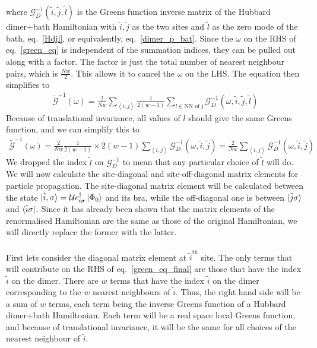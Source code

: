 \documentclass{report}
\numberwithin{equation}{section}
\begin{document}
where $\mathcal{G}_D^{-1}(\tilde i,\tilde j, \tilde l)$ is the Greens function inverse matrix of the Hubbard dimer+bath Hamiltonian with $\tilde i, \tilde j$ as the two sites and \(\tilde l\) as the zero mode of the bath, eq.~\ref{Hdjl}, or equivalently, eq.~\ref{dimer_p_bat}. Since the $\omega$ on the RHS of eq.~\ref{green_eq} is independent of the summation indices, they can be pulled out along with a factor. The factor is just the total number of nearest neighbour pairs, which is $\frac{Nw}{2}$. This allows it to cancel the $\omega$ on the LHS. The equation then simplifies to
\begin{equation}\begin{aligned}
	\mathcal{\tilde G}^{-1}(\omega) = \frac{2}{Nw}\sum_{\left<i,j\right>}\frac{1}{2(w-1)}\sum_{l \in \text{NN of j}}\mathcal{G}_D^{-1}\left(\omega, \tilde i, \tilde j, \tilde l\right)
\end{aligned}\end{equation}
Because of translational invariance, all values of \(l\) should give the same Greens function, and we can simplify this to
\begin{equation}\begin{aligned}
	\label{green_eq_final}
	\mathcal{\tilde G}^{-1}(\omega) = \frac{2}{Nw}\frac{1}{2(w-1)}\times 2(w-1)\sum_{\left<i,j\right>}\mathcal{G}_D^{-1}\left(\omega, \tilde i, \tilde j\right) = \frac{2}{Nw}\sum_{\left<i,j\right>}\mathcal{G}_D^{-1}\left(\omega, \tilde i, \tilde j\right)
\end{aligned}\end{equation}
We dropped the index \(\tilde l\) on \(\mathcal{G}_D^{-1}\) to mean that any particular choice of \(\tilde l\) will do. We will now calculate the site-diagonal and site-off-diagonal matrix elements for particle propagation. The site-diagonal matrix element will be calculated between the state $\ket{\tilde i, \sigma} = \mathcal{U}c^\dagger_{i\sigma}\ket{\Phi_0}$ and its bra, while the off-diagonal one is between $\ket{\tilde j\sigma}$ and $\bra{\tilde i\sigma}$. Since it has already been shown that the matrix elements of the renormalised Hamiltonian are the same as those of the original Hamiltonian, we will directly replace the former with the latter. \\\\
First lets consider the diagonal matrix element at $\tilde i^\text{th}$ site. The only terms that will contribute on the RHS of eq.~\ref{green_eq_final} are those that have the index $\tilde i$ on the dimer. There are $w$ terms that have the index \(\tilde i\) on the dimer corresponding to the $w$ nearest neighbours of \(\tilde i\). Thus, the right hand side will be a sum of $w$ terms, each term being the inverse Greens function of a Hubbard dimer+bath Hamiltonian. Each term will be a real space local Greens function, and because of translational invariance, it will be the same for all choices of the nearest neighbour of \(\tilde i\).
\end{document}
